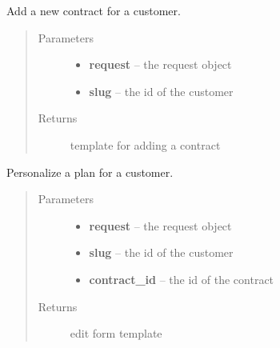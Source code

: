\documentclass[letterpaper,10pt,english]{sphinxmanual}
\begin{document}

\begin{fulllineitems}
\label{api/system:limeade.system.views.contract_add}
Add a new contract for a customer.
\begin{quote}\begin{description}
\item[{Parameters}] \leavevmode\begin{itemize}
\item {} 
\textbf{request} -- the request object

\item {} 
\textbf{slug} -- the id of the customer

\end{itemize}

\item[{Returns}] \leavevmode
template for adding a contract

\end{description}\end{quote}

\end{fulllineitems}


\begin{fulllineitems}
\label{api/system:limeade.system.views.contract_customize}
Personalize a plan for a customer.
\begin{quote}\begin{description}
\item[{Parameters}] \leavevmode\begin{itemize}
\item {} 
\textbf{request} -- the request object

\item {} 
\textbf{slug} -- the id of the customer

\item {} 
\textbf{contract\_id} -- the id of the contract

\end{itemize}

\item[{Returns}] \leavevmode
edit form template

\end{description}\end{quote}

\end{fulllineitems}
\end{document}
